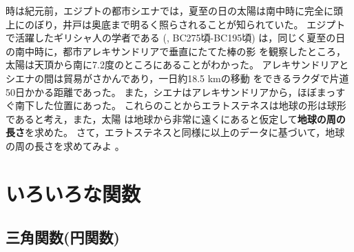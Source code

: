 \documentclass[twocolumn,11pt]{jarticle}
\begin{document}
\nquestion
時は紀元前，エジプトの都市シエナでは，夏至の日の太陽は南中時に完全に頭
上にのぼり，井戸は奥底まで明るく照らされることが知られていた。
エジプトで活躍したギリシャ人の学者である
(, BC275頃-BC195頃)
は，同じく夏至の日の南中時に，都市アレキサンドリアで垂直にたてた棒の影
を観察したところ，太陽は天頂から南に7.2度のところにあることがわかった。
アレキサンドリアとシエナの間は貿易がさかんであり，一日約18.5 kmの移動
をできるラクダで片道50日かかる距離であった。
また，シエナはアレキサンドリアから，ほぼまっすぐ南下した位置にあった。
これらのことからエラトステネスは地球の形は球形であると考え，また，太陽
は地球から非常に遠くにあると仮定して\textbf{地球の周の長さ}を求めた。
さて，エラトステネスと同様に以上のデータに基づいて，地球の周の長さを求めてみよ
。

\newpage

\section{いろいろな関数}

\subsection{三角関数(円関数)\label{sec:sin}}
\end{document}

